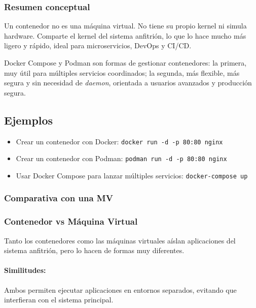 \subsubsection{Resumen conceptual}
Un contenedor no es una máquina virtual. No tiene su propio kernel ni simula hardware. Comparte el kernel del sistema anfitrión, lo que lo hace mucho más ligero y rápido, ideal para microservicios, DevOps y CI/CD.

Docker Compose y Podman son formas de gestionar contenedores: la primera, muy útil para múltiples servicios coordinados; la segunda, más flexible, más segura y sin necesidad de \textit{daemon}, orientada a usuarios avanzados y producción segura.

\subsection{Ejemplos}
\begin{itemize}
    \item Crear un contenedor con Docker: \texttt{docker run -d -p 80:80 nginx}
    \item Crear un contenedor con Podman: \texttt{podman run -d -p 80:80 nginx}
    \item Usar Docker Compose para lanzar múltiples servicios: \texttt{docker-compose up}
\end{itemize}

\subsubsection{Comparativa con una MV}

\subsubsection{Contenedor vs Máquina Virtual}

Tanto los contenedores como las máquinas virtuales aíslan aplicaciones del sistema anfitrión, pero lo hacen de formas muy diferentes.

\paragraph{Similitudes:}
Ambos permiten ejecutar aplicaciones en entornos separados, evitando que interfieran con el sistema principal.

